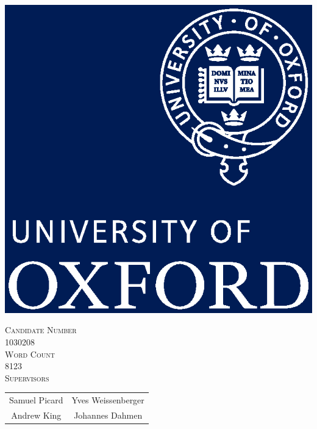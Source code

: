 \documentclass[]{report}
\theoremstyle{definition}
\theoremstyle{definition}
\theoremstyle{definition}
\theoremstyle{remark}
\begin{document}
\begin{titlepage}
\includegraphics[height=0.2\textheight]{figs/ox_sigil.eps}\\[1cm] %




\vfill


\begin{Large}
\textsc{Candidate Number}\\1030208\\[1cm]
\textsc{Word Count}\\8123\\[1cm]
\textsc{Supervisors}\\
\begin{tabular}{cc}
Samuel Picard&
Yves Weissenberger\\
Andrew King&
Johannes Dahmen
\end{tabular}
\end{Large}

\vfill

\end{titlepage}
\end{document}
